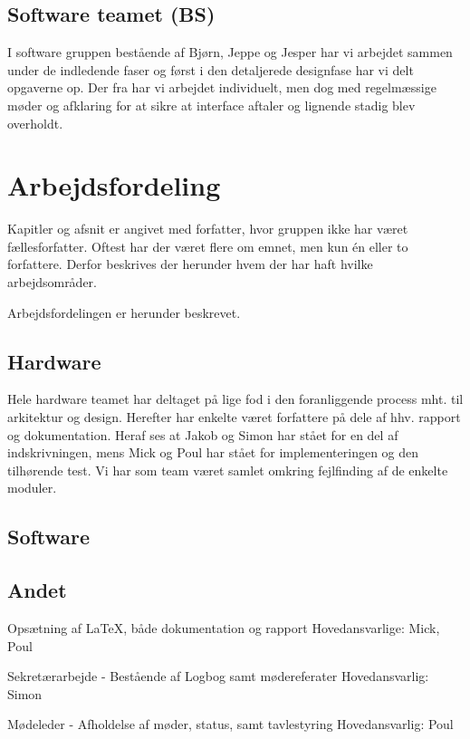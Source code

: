 \subsection{Software teamet (BS)}
I software gruppen bestående af Bjørn, Jeppe og Jesper har vi arbejdet sammen under de indledende faser og først i den detaljerede designfase har vi delt opgaverne op.
Der fra har vi arbejdet individuelt, men dog med regelmæssige møder og afklaring for at sikre at interface aftaler og lignende stadig blev overholdt.


\section{Arbejdsfordeling}
 
Kapitler og afsnit er angivet med forfatter, hvor gruppen ikke har været fællesforfatter. Oftest har der været flere om emnet, men kun én eller to forfattere. Derfor beskrives der herunder hvem der har haft hvilke arbejdsområder.  

Arbejdsfordelingen er herunder beskrevet. 

\subsection{Hardware} 
Hele hardware teamet har deltaget på lige fod i den foranliggende process mht. til arkitektur og design. Herefter har enkelte været forfattere på dele af hhv. rapport og dokumentation. Heraf ses at Jakob og Simon har stået for en del af indskrivningen, mens Mick og Poul har stået for implementeringen og den tilhørende test.
Vi har som team været samlet omkring fejlfinding af de enkelte moduler.  

\subsection{Software}


\subsection{Andet}

Opsætning af \LaTeX, både dokumentation og rapport
Hovedansvarlige: Mick, Poul 

Sekretærarbejde - Bestående af Logbog samt mødereferater
Hovedansvarlig: Simon

Mødeleder - Afholdelse af møder, status, samt tavlestyring 
Hovedansvarlig: Poul




